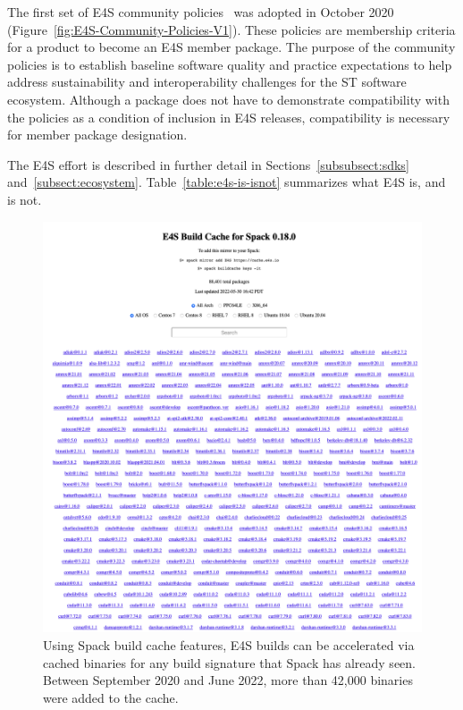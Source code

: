 The first set of E4S community policies~\cite{e4s:policies} was adopted in October 2020 (Figure~\ref{fig:E4S-Community-Policies-V1}). These policies are membership criteria for a product to become an E4S member package. The purpose of the community policies is to establish baseline software quality and practice expectations to help address sustainability and interoperability challenges for the ST software ecosystem. Although a package does not have to demonstrate compatibility with the policies as a condition of inclusion in E4S releases, compatibility is necessary for member package designation.

The E4S effort is described in further detail in Sections~\ref{subsubsect:sdks} and~\ref{subsect:ecosystem}. Table~\ref{table:e4s-is-isnot} summarizes what E4S is, and is not. 

\begin{figure}
	\centering
	\includegraphics[width=0.9\linewidth]{projects/2.3.5-Ecosystem/2.3.5.01-Ecosystem-SDK/E4S_buildcache_Jun22}
	\caption{Using Spack build cache features, E4S builds can be accelerated via cached binaries for any build signature that Spack has already seen. Between September 2020 and June 2022, more than 42,000 binaries were added to the cache.}
	\label{fig:e4s-build-cache}
\end{figure}

